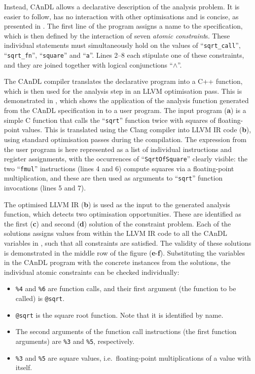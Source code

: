     Instead, CAnDL allows a declarative description of the analysis problem.
    It is easier to follow, has no interaction with other optimisations and
    is concise, as presented in .
    The first line of the program assigns a name to the specification, which is
    then defined by the interaction of seven {\em atomic constraint}s.
    These individual statements must simultaneously hold on the values of
    ``\texttt{sqrt\_call}'', ``\texttt{sqrt\_fn}'', ``\texttt{square}'' and
    ``\texttt{a}''.
    Lines 2--8 each stipulate one of these constraints, and they are joined
    together with logical conjunctions ``$\land$''.

    The CAnDL compiler translates the declarative program into a C++ function,
    which is then used for the analysis step in an LLVM optimisation pass.
    This is demonstrated in , which shows the application
    of the analysis function generated from the CAnDL specification in
     to a user program.
    The input program ({\bf a}) is a simple C function that calls the
    ``\texttt{sqrt}'' function twice with squares of floating-point values.
    This is translated using the Clang compiler into LLVM IR code ({\bf b}),
    using standard optimisation passes during the compilation.
    The expression from the user program is here represented as a list of
    individual instructions and register assignments, with the occurrences
    of ``\texttt{SqrtOfSquare}'' clearly visible: the two ``\texttt{fmul}''
    instructions (lines 4 and 6) compute squares via a floating-point
    multiplication, and these are then used as arguments to ``\texttt{sqrt}''
    function invocations (lines 5 and 7).

    The optimised LLVM IR ({\bf b}) is used as the input to the generated
    analysis function, which detects two optimisation opportunities.
    These are identified as the first ({\bf c}) and second ({\bf d}) solution
    of the constraint problem.
    Each of the solutions assigns values from within the LLVM IR code to
    all the CAnDL variables in , such
    that all constraints are satisfied.
    The validity of these solutions is demonstrated in the middle row of the
    figure ({\bf e}-{\bf f}).
    Substituting the variables in the CAnDL program with the concrete instances
    from the solutions, the individual atomic constraints can be checked
    individually:
    \begin{itemize}
    \item \texttt{\%4} and \texttt{\%6} are function calls, and their first
          argument (the function to be called) is \texttt{@sqrt}.
    \item \texttt{@sqrt} is the square root function.
          Note that it is identified by name.
    \item The second arguments of the function call instructions (the first
          function arguments) are \texttt{\%3} and \texttt{\%5},
          respectively.
    \item \texttt{\%3} and \texttt{\%5} are square values, i.e.\ 
          floating-point multiplications of a value with itself.
    \end{itemize}

